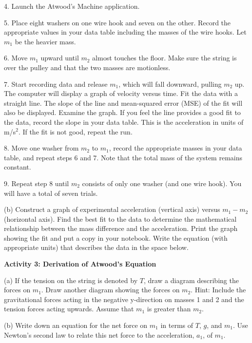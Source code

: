 4. Launch the Atwood's Machine application.

5. Place eight washers on one wire hook and seven on the other. Record the appropriate
values in your data table including the masses of the wire hooks. Let \( m_{1} \)
be the heavier mass. 

6. Move \( m_{1} \) upward until \( m_{2} \) almost touches the floor. Make
sure the string is over the pulley and that the two masses are motionless. 

7. Start recording data and release \( m_{1} \), which will fall downward,
pulling \( m_{2} \) up. The computer will display a graph of velocity versus
time. Fit the data with a straight line. The slope of the line and mean-squared
error (MSE) of the fit will also be displayed. Examine the graph. If you feel
the line provides a good fit to the data, record the slope in your data table.
This is the acceleration in units of m/s\( ^{2} \). If the fit is not good,
repeat the run. 

8. Move one washer from \( m_{2} \) to \( m_{1} \), record the appropriate
masses in your data table, and repeat steps 6 and 7. Note that the total mass
of the system remains constant. 

9. Repeat step 8 until \( m_{2} \) consists of only one washer (and one wire
hook). You will have a total of seven trials.

(b) Construct a graph of experimental acceleration (vertical axis) versus \( m_{1}  - m_{2} \) (horizontal axis). Find the best fit to the data to determine the mathematical relationship between the mass difference and the acceleration. Print the graph showing the fit and put a copy in your notebook. Write the equation (with appropriate units) that describes the data in the space below.
\vspace{20mm}

\textbf{Activity 3: Derivation of Atwood's Equation }

(a) If the tension on the string is denoted by $T$, draw a diagram describing
the forces on \( m_{1} \). Draw another diagram showing the forces on \( m_{2} \).
Hint: Include the gravitational forces acting in the negative y-direction on
masses 1 and 2 and the tension forces acting upwards. Assume that \( m_{1} \)
is greater than \( m_{2} \).
\vspace{20mm}

(b) Write down an equation for the net force on \( m_{1} \) in terms of $T$, $g$, and \( m_{1} \). Use Newton's second law to relate this net force to the acceleration, \( a_{1} \), of \( m_{1} \).
\vspace{20mm}

